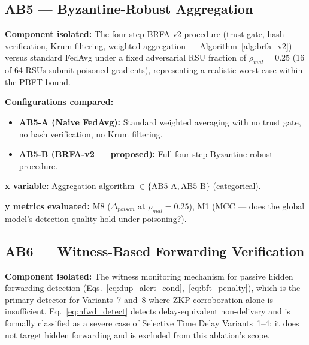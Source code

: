 \documentclass[12pt, a4paper]{report}
\begin{document}
{{%
\subsection{AB5 — Byzantine-Robust Aggregation}
\label{sec:ab5}

\textbf{Component isolated:}
The four-step BRFA-v2 procedure (trust gate, hash
verification, Krum filtering, weighted aggregation —
Algorithm~\ref{alg:brfa_v2}) versus standard FedAvg
under a fixed adversarial RSU fraction of
$\rho_{mal} = 0.25$ (16 of 64 RSUs submit poisoned
gradients), representing a realistic worst-case within
the PBFT bound.

\textbf{Configurations compared:}
\begin{itemize}
    \item \textbf{AB5-A (Naive FedAvg):} Standard
    weighted averaging with no trust gate, no hash
    verification, no Krum filtering.
    \item \textbf{AB5-B (BRFA-v2 — proposed):}
    Full four-step Byzantine-robust procedure.
\end{itemize}

\textbf{x variable:} Aggregation algorithm
$\in \{\text{AB5-A}, \text{AB5-B}\}$ (categorical).

\textbf{y metrics evaluated:} M8 ($\Delta_{poison}$
at $\rho_{mal} = 0.25$), M1 (MCC — does the global
model's detection quality hold under poisoning?).


\subsection{AB6 — Witness-Based Forwarding Verification}
\label{sec:ab6}

\textbf{Component isolated:}
The witness monitoring mechanism for passive hidden
forwarding detection
(Eqs.~\ref{eq:dup_alert_cond},~\ref{eq:bft_penalty}),
which is the primary detector for Variants~7 and~8
where \ac{ZKP} corroboration alone is insufficient.
Eq.~\ref{eq:nfwd_detect} detects delay-equivalent
non-delivery and is formally classified as a severe
case of Selective Time Delay Variants~1--4; it does
not target hidden forwarding and is excluded from
this ablation's scope.


}}
\end{document}
